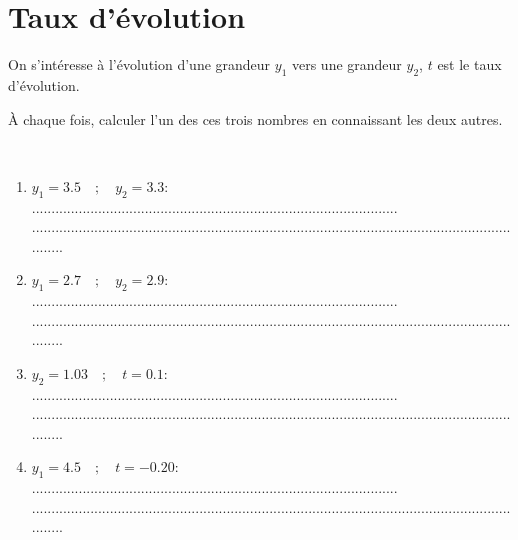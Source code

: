 \section{Taux d'évolution}
On s'intéresse à l'évolution d'une grandeur $y_1$ vers une grandeur $y_2$, $t$ est le taux d'évolution.

\`A chaque fois, calculer l'un des ces trois nombres en connaissant les deux autres.

\begin{questions}
	\question[4] \ 
	\begin{enumerate}[label=\alph*)]
		
		\item $y_1 = \num{3.5} \quad ; \quad y_2=\num{3.3} $:  ..............................................................................................\\
		...................................................................................................................................
		\item $y_1 = \num{2.7} \quad ; \quad y_2=\num{2.9} $:  ..............................................................................................\\
		...................................................................................................................................
		\item $y_2 = \num{1.03} \quad ; \quad t=\num{0.1} $:  ..............................................................................................\\
		...................................................................................................................................
		\item $y_1 = \num{4.5} \quad ; \quad t=\num{-0.20} $:   ..............................................................................................\\
		...................................................................................................................................
		\end{enumerate}
\end{questions}